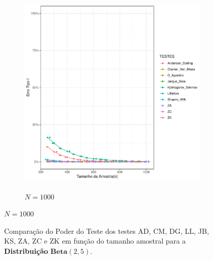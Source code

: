 \documentclass[final]{beamer}
\begin{document}
\begin{frame}[t]
\begin{columns}[t,totalwidth=0.6\paperwidth]
\begin{column}{0.45\textwidth}
\begin{figure}[H]
\begin{subfigure}[b]{0.32\textwidth}
        \centering
        \includegraphics[height=10cm,keepaspectratio]{Distribuição_Beta/Erro_TipoI/erro_tipo_I_beta_1000.pdf}
        \caption{\(N = 1000\)}
    \end{subfigure}
\end{figure}

\begin{figure}[H]
    \centering
    \caption{Comparação do Poder do Teste dos testes AD, CM, DG, LL, JB, KS, ZA, ZC e ZK
    em função do tamanho amostral para a \textbf{Distribuição} \(\textbf{Beta}(2,5)\).}
    \label{fig:poder_teste_beta}


\end{figure}
\end{column}
\end{columns}
\end{frame}
\end{document}
